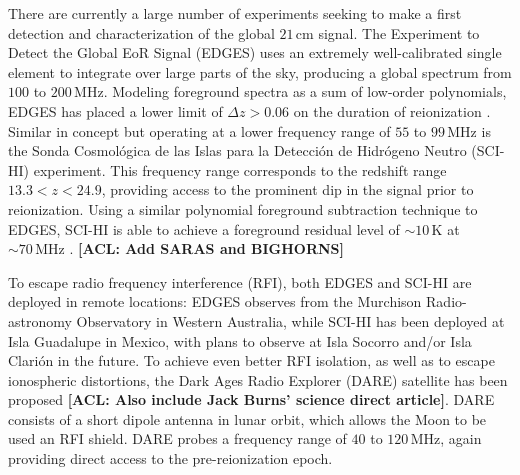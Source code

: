 \documentclass[twocolumn,apj,numberedappendix]{emulateapj}
\newcommand{\acl}[1]{{\color{red} \textbf{[ACL:  #1]}}}
\begin{document}
There are currently a large number of experiments seeking to make a first detection and characterization of the global $21\,\textrm{cm}$ signal.  The Experiment to Detect the Global EoR Signal (EDGES) uses an extremely well-calibrated single element \citep{rogersCalib} to integrate over large parts of the sky, producing a global spectrum from $100$ to $200\,\textrm{MHz}$.  Modeling foreground spectra as a sum of low-order polynomials, EDGES has placed a lower limit of $\Delta z > 0.06$ on the duration of reionization \citep{bowmanRogersMeasurement}.  Similar in concept but operating at a lower frequency range of $55$ to $99\,\textrm{MHz}$ is the Sonda Cosmol\'{o}gica de las Islas para la Detecci\'{o}n de Hidr\'{o}geno Neutro (SCI-HI) experiment.  This frequency range corresponds to the redshift range $13.3 < z < 24.9$, providing access to the prominent dip in the signal prior to reionization.  Using a similar polynomial foreground subtraction technique to EDGES, SCI-HI is able to achieve a foreground residual level of $\sim 10\,\textrm{K}$ at $\sim 70 \,\textrm{MHz}$ \citep{voytekSCIHI}. \acl{Add SARAS and BIGHORNS}

To escape radio frequency interference (RFI), both EDGES and SCI-HI are deployed in remote locations: EDGES observes from the Murchison Radio-astronomy Observatory in Western Australia, while SCI-HI has been deployed at Isla Guadalupe in Mexico, with plans to observe at Isla Socorro and/or Isla Clari\'{o}n in the future.  To achieve even better RFI isolation, as well as to escape ionospheric distortions, the Dark Ages Radio Explorer (DARE) satellite has been proposed \citep{DAREMCMC} \acl{Also include Jack Burns' science direct article}.  DARE consists of a short dipole antenna in lunar orbit, which allows the Moon to be used an RFI shield.  DARE probes a frequency range of $40$ to $120\,\textrm{MHz}$, again providing direct access to the pre-reionization epoch.
\end{document}
